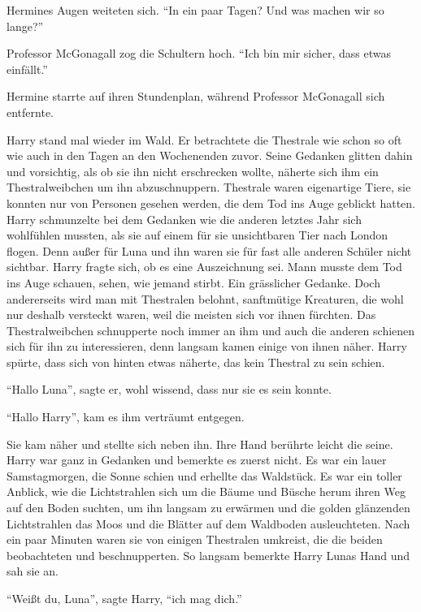 Hermines Augen weiteten sich. \enquote{In ein paar Tagen? Und was machen wir so lange?}

Professor McGonagall zog die Schultern hoch. \enquote{Ich bin mir sicher, dass  etwas einfällt.}

Hermine starrte auf ihren Stundenplan, während Professor McGonagall sich entfernte.

\trenn

Harry stand mal wieder im Wald. Er betrachtete die Thestrale \gst wie schon so oft \gst wie auch in den Tagen an den Wochenenden zuvor. Seine Gedanken glitten dahin und vorsichtig, als ob sie ihn nicht erschrecken wollte, näherte sich ihm ein Thestralweibchen um ihn abzuschnuppern. Thestrale waren eigenartige Tiere, sie konnten nur von Personen gesehen werden, die dem Tod ins Auge geblickt hatten. Harry schmunzelte bei dem Gedanken wie die anderen letztes Jahr sich wohlfühlen mussten, als sie auf einem für sie unsichtbaren Tier nach London flogen. Denn außer für Luna und ihn waren sie für fast alle anderen Schüler nicht sichtbar. Harry fragte sich, ob es eine Auszeichnung sei. Mann musste dem Tod ins Auge schauen, sehen, wie jemand stirbt. Ein grässlicher Gedanke. Doch andererseits wird man mit Thestralen belohnt, sanftmütige Kreaturen, die wohl nur deshalb versteckt waren, weil die meisten sich vor ihnen fürchten. Das Thestralweibchen schnupperte noch immer an ihm und auch die anderen schienen sich für ihn zu interessieren, denn langsam kamen einige von ihnen näher. Harry spürte, dass sich von hinten etwas näherte, das kein Thestral zu sein schien.

\enquote{Hallo Luna}, sagte er, wohl wissend, dass nur sie es sein konnte.

\enquote{Hallo Harry}, kam es ihm verträumt entgegen.

Sie kam näher und stellte sich neben ihn. Ihre Hand berührte leicht die seine. Harry war ganz in Gedanken und bemerkte es zuerst nicht. Es war ein lauer Samstagmorgen, die Sonne schien und erhellte das Waldstück. Es war ein toller Anblick, wie die Lichtstrahlen sich um die Bäume und Büsche herum ihren Weg auf den Boden suchten, um ihn langsam zu erwärmen und die golden glänzenden Lichtstrahlen das Moos und die Blätter auf dem Waldboden ausleuchteten. Nach ein paar Minuten waren sie von einigen Thestralen umkreist, die die beiden beobachteten und beschnupperten. So langsam bemerkte Harry Lunas Hand und sah sie an.

\enquote{Weißt du, Luna}, sagte Harry, \enquote{ich mag dich.}

